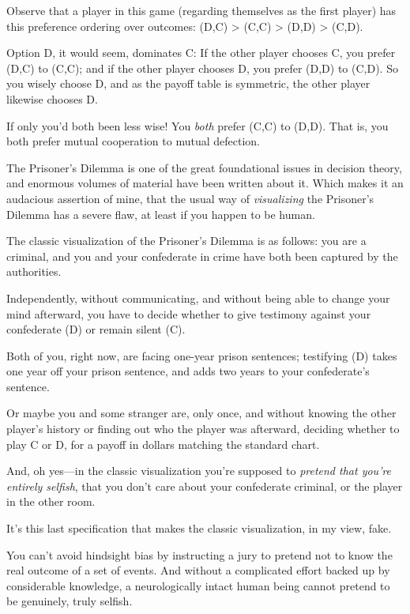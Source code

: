 {
 Observe that a player in this game (regarding themselves as the
first player) has this preference ordering over outcomes: (D,C)
{\textgreater} (C,C) {\textgreater} (D,D) {\textgreater} (C,D).}

{
 Option D, it would seem, dominates C: If the other player chooses
C, you prefer (D,C) to (C,C); and if the other player chooses D, you
prefer (D,D) to (C,D). So you wisely choose D, and as the payoff table
is symmetric, the other player likewise chooses D.}

{
 If only you'd both been less wise! You
\textit{both} prefer (C,C) to (D,D). That is, you both prefer mutual
cooperation to mutual defection.}

{
 The Prisoner's Dilemma is one of the great
foundational issues in decision theory, and enormous volumes of
material have been written about it. Which makes it an audacious
assertion of mine, that the usual way of \textit{visualizing} the
Prisoner's Dilemma has a severe flaw, at least if you
happen to be human.}

{
 The classic visualization of the Prisoner's
Dilemma is as follows: you are a criminal, and you and your confederate
in crime have both been captured by the authorities.}

{
 Independently, without communicating, and without being able to
change your mind afterward, you have to decide whether to give
testimony against your confederate (D) or remain silent (C).}

{
 Both of you, right now, are facing one-year prison sentences;
testifying (D) takes one year off your prison sentence, and adds two
years to your confederate's sentence.}

{
 Or maybe you and some stranger are, only once, and without knowing
the other player's history or finding out who the
player was afterward, deciding whether to play C or D, for a payoff in
dollars matching the standard chart.}

{
 And, oh yes---in the classic visualization you're
supposed to \textit{pretend that you're entirely
selfish}, that you don't care about your confederate
criminal, or the player in the other room.}

{
 It's this last specification that makes the
classic visualization, in my view, fake.}

{
 You can't avoid hindsight bias by instructing a
jury to pretend not to know the real outcome of a set of events. And
without a complicated effort backed up by considerable knowledge, a
neurologically intact human being cannot pretend to be genuinely, truly
selfish.}

